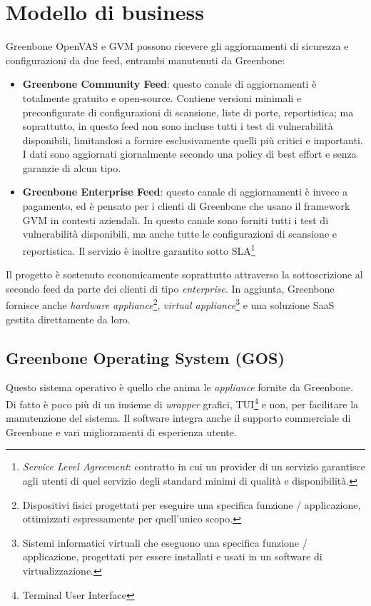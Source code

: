 \section{Modello di business}
Greenbone OpenVAS e GVM possono ricevere gli aggiornamenti di sicurezza e configurazioni da due feed, entrambi manutenuti da Greenbone:
\label{feed}
\begin{itemize}
    \item \textbf{Greenbone Community Feed}: questo canale di aggiornamenti è totalmente gratuito e open-source. Contiene versioni minimali e preconfigurate di configurazioni di scansione, liste di porte, reportistica; ma soprattutto, in questo feed non sono incluse tutti i test di vulnerabilità disponibili, limitandosi a fornire esclusivamente quelli più critici e importanti. I dati sono aggiornati giornalmente secondo una policy di best effort e senza garanzie di alcun tipo.
    \item \textbf{Greenbone Enterprise Feed}: questo canale di aggiornamenti è invece a pagamento, ed è pensato per i clienti di Greenbone che usano il framework GVM in contesti aziendali. In questo canale sono forniti tutti i test di vulnerabilità disponibili, ma anche tutte le configurazioni di scansione e reportistica. Il servizio è inoltre garantito sotto SLA\footnote{\emph{Service Level Agreement}: contratto in cui un provider di un servizio garantisce agli utenti di quel servizio degli standard minimi di qualità e disponibilità.}
\end{itemize}
Il progetto è sostenuto economicamente soprattutto attraverso la sottoscrizione al secondo feed da parte dei clienti di tipo \emph{enterprise}. In aggiunta, Greenbone fornisce anche \emph{hardware appliance}\footnote{Dispositivi fisici progettati per eseguire una specifica funzione / applicazione, ottimizzati espressamente per quell'unico scopo.}, \emph{virtual appliance}\footnote{Sistemi informatici virtuali che eseguono una specifica funzione / applicazione, progettati per essere installati e usati in un software di virtualizzazione.} e una soluzione SaaS gestita direttamente da loro.

\subsection{Greenbone Operating System (GOS)}
Questo sistema operativo è quello che anima le \emph{appliance} fornite da Greenbone. Di fatto è poco più di un insieme di \emph{wrapper} grafici, TUI\footnote{Terminal User Interface} e non, per facilitare la manutenzione del sistema. Il software integra anche il supporto commerciale di Greenbone e vari miglioramenti di esperienza utente.

